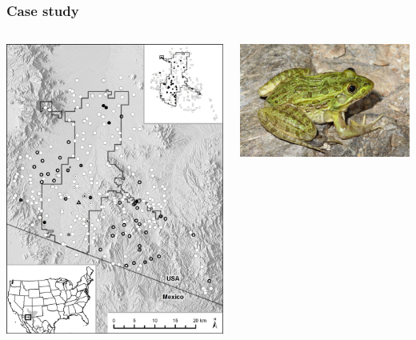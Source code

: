 \documentclass[color=usenames,dvipsnames]{beamer}\usepackage[]{graphicx}\usepackage[]{xcolor}
\begin{document}
\begin{frame}
  \frametitle{Case study}
  \begin{columns}
    \begin{column}{0.5\textwidth}
      \includegraphics[width=\textwidth]{figs/Altar}
    \end{column}
    \begin{column}{0.5\textwidth}
      \includegraphics[width=\textwidth]{figs/lich} \\

\end{column}
\end{columns}
\end{frame}
\end{document}

